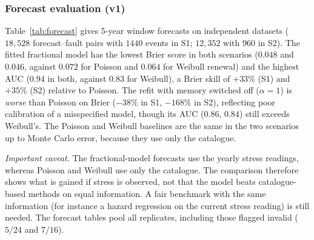 \documentclass[11pt,a4paper]{article}
\newcommand{\Tb}{\bar T}
\begin{document}
\begin{table}[t]
\centering\small

\caption{Fits with a wrong reference recurrence time (S1, $12$ datasets; truth: $\alpha=0.7$, $\gamma=0.08$, $c=10$, $b=3$). Loss is the drop of the maximised log-likelihood relative to the fit with the correct $\Tb$.}\label{tab:misspec}
\end{table}

\subsubsection*{Forecast evaluation (v1)}
Table~\ref{tab:forecast} gives 5-year window forecasts on independent datasets ($18{,}528$ forecast--fault pairs with $1440$ events in S1; $12{,}352$ with $960$ in S2). The fitted fractional model has the lowest Brier score in both scenarios ($0.048$ and $0.046$, against $0.072$ for Poisson and $0.064$ for Weibull renewal) and the highest AUC ($0.94$ in both, against $0.83$ for Weibull), a Brier skill of $+33\%$ (S1) and $+35\%$ (S2) relative to Poisson. The refit with memory switched off ($\alpha=1$) is \emph{worse} than Poisson on Brier ($-38\%$ in S1, $-168\%$ in S2), reflecting poor calibration of a misspecified model, though its AUC ($0.86$, $0.84$) still exceeds Weibull's. The Poisson and Weibull baselines are the same in the two scenarios up to Monte Carlo error, because they use only the catalogue.

\emph{Important caveat.} The fractional-model forecasts use the yearly stress readings, whereas Poisson and Weibull use only the catalogue. The comparison therefore shows what is gained if stress is observed, not that the model beats catalogue-based methods on equal information. A fair benchmark with the same information (for instance a hazard regression on the current stress reading) is still needed. The forecast tables pool all replicates, including those flagged invalid ($5/24$ and $7/16$).

\begin{table}[t]
\centering\small

\caption{Out-of-sample 5-year window forecasts (24 replicates in S1, 16 in S2). The fractional model uses the stress readings; the baselines use only the catalogue.}\label{tab:forecast}
\end{table}
\end{document}
